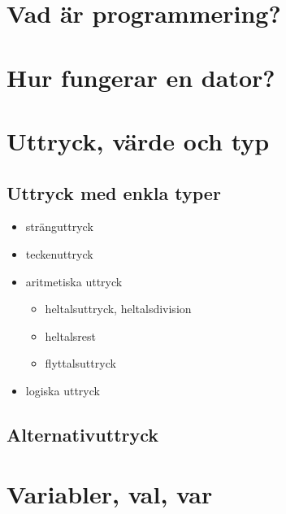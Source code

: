 

\clearpage
\section{Vad är programmering?}




\section{Hur fungerar en dator?}
\lipsum[2]

\section{Uttryck, värde och typ}

\subsection{Uttryck med enkla typer}

\begin{itemize}
\item stränguttryck
\item teckenuttryck
\item aritmetiska uttryck
\begin{itemize}
\item heltalsuttryck, heltalsdivision
\item heltalsrest
\item flyttalsuttryck
\end{itemize}
\item logiska uttryck


\end{itemize}

\subsection{Alternativuttryck}

\section{Variabler, val, var}







